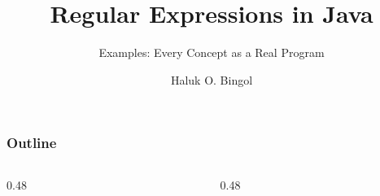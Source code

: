 \documentclass[aspectratio=169,10pt,compress]{beamer}
\title{Regular Expressions in Java}
\subtitle{Examples: Every Concept as a Real Program}
\author[Bingol]{Haluk O. Bingol}
\institute[FCIS]{
    Faculty of Computer and Information Sciences\\
    Yeditepe University
}
\date{
	{\tiny \hbTimeStamp}
}
\begin{document}
\begin{frame}[t,fragile]
  \titlepage
\end{frame}




\begin{frame}[t,fragile] \frametitle{Outline}
  \begin{columns}[T]
    \begin{column}{0.48\textwidth}
      \tableofcontents[sections={1-3}, hideallsubsections]
    \end{column}
    \begin{column}{0.48\textwidth}
      \tableofcontents[sections={4-6}, hideallsubsections]
    \end{column}
  \end{columns}
\end{frame}
\end{document}
